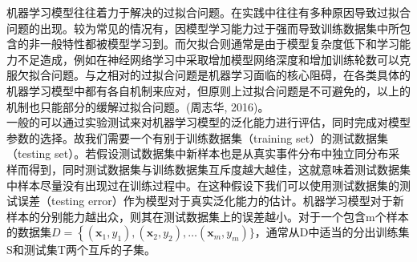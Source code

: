  



 \indent 机器学习模型往往着力于解决的过拟合问题。在实践中往往有多种原因导致过拟合问题的出现。较为常见的情况有，因模型学习能力过于强而导致训练数据集中所包含的非一般特性都被模型学习到。而欠拟合则通常是由于模型复杂度低下和学习能力不足造成，例如在神经网络学习中采取增加模型网络深度和增加训练轮数可以克服欠拟合问题。与之相对的过拟合问题是机器学习面临的核心阻碍，在各类具体的机器学习模型中都有各自机制来应对，但原则上过拟合问题是不可避免的，以上的机制也只能部分的缓解过拟合问题。(周志华, 2016)。\\
 \indent 一般的可以通过实验测试来对机器学习模型的泛化能力进行评估，同时完成对模型参数的选择。故我们需要一个有别于训练数据集（training set）的测试数据集（testing set）。若假设测试数据集中新样本也是从真实事件分布中独立同分布采样而得到，同时测试数据集与训练数据集互斥度越大越佳，这就意味着测试数据集中样本尽量没有出现过在训练过程中。在这种假设下我们可以使用测试数据集的测试误差（testing error）作为模型对于真实泛化能力的估计。机器学习模型对于新样本的分别能力越出众，则其在测试数据集上的误差越小。对于一个包含m个样本的数据集$D=\left\{\left(\boldsymbol{x}_{1}, y_{1}\right),\left(\boldsymbol{x}_{2}, y_{2}\right), \ldots\right.\left(\boldsymbol{x}_{m}, y_{m}\right) \}$，通常从D中适当的分出训练集S和测试集T两个互斥的子集。\\
